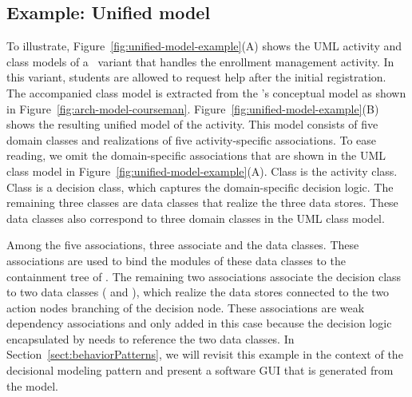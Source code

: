 \subsection*{Example: Unified model}
%

To illustrate, Figure~\ref{fig:unified-model-example}(A) shows the UML activity and class models of a \courseman~variant that handles the enrollment management activity. In this variant, students are allowed to request help after the initial registration. The accompanied class model is extracted from the \courseman's conceptual model as shown in Figure~\ref{fig:arch-model-courseman}.
%
Figure~\ref{fig:unified-model-example}(B) shows the resulting unified model of the activity.
This model consists of five domain classes and realizations of five activity-specific associations. To ease reading, we omit the domain-specific associations that are shown in the UML class model in Figure~\ref{fig:unified-model-example}(A). Class  is the activity class. Class  is a decision class, which captures the domain-specific decision logic. The remaining three classes are data classes that realize the three data stores. These data classes also correspond to three domain classes in the UML class model. 

Among the five associations, three associate  and the data classes. These associations are used to bind the modules of these data classes to the containment tree of .
The remaining two associations associate the decision class  to two data classes ( and ), which realize the data stores connected to the two action nodes branching of the decision node. These associations are weak dependency associations and only added in this case because the decision logic encapsulated by  needs to reference the two data classes.
%
In Section~\ref{sect:behaviorPatterns}, we will revisit this example in the context of the decisional modeling pattern and present a software GUI that is generated from the model.
